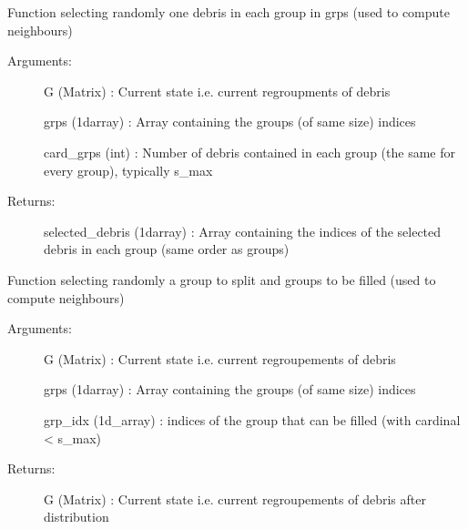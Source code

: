 \documentclass[letterpaper,10pt,english]{sphinxmanual}
\begin{document}

\begin{fulllineitems}
\label{\detokenize{regroupement/optimizer:regroupement.optimizer.Metropolis.select_random_debris}}
Function selecting randomly one debris in each group in grps (used to compute neighbours)
\begin{description}
\item[{Arguments:}] \leavevmode
G (Matrix) : Current state  i.e. current regroupments of debris

grps (1d\sphinxhyphen{}array) : Array containing the groups (of same size) indices

card\_grps (int) : Number of debris contained in each group (the same for every group), typically s\_max

\item[{Returns:}] \leavevmode
selected\_debris (1d\sphinxhyphen{}array) : Array containing the indices of the selected debris in each group (same order as groups)

\end{description}

\end{fulllineitems}


\begin{fulllineitems}
\label{\detokenize{regroupement/optimizer:regroupement.optimizer.Metropolis.split_and_fill}}
Function selecting randomly a group to split and groups to be filled (used to compute neighbours)
\begin{description}
\item[{Arguments:}] \leavevmode
G (Matrix) : Current state  i.e. current regroupements of debris

grps (1d\sphinxhyphen{}array) : Array containing the groups (of same size) indices

grp\_idx (1d\_array) : indices of the group that can be filled (with cardinal \textless{} s\_max)

\item[{Returns:}] \leavevmode
G (Matrix) : Current state  i.e. current regroupements of debris after distribution

\end{description}

\end{fulllineitems}
\end{document}
